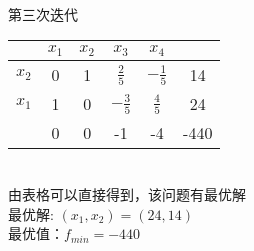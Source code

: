\documentclass{article}
\begin{document}
\\
\\
\\
第三次迭代
\begin{table}[h]
    \setlength{\abovecaptionskip}{0.cm}
    \centering
    \begin{tabular}
        {>{}rccccc}
        \toprule[1pt]
        \rowcolor[gray]{0.9}    &$x_1$ &$x_2$   &$x_3$  &$x_4$ & \\
        \midrule
        $x_2$   &0   &1  &$\frac{2}{5}$  &$-\frac{1}{5}$ & 14  \\
        $x_1$   &1 &0    &$-\frac{3}{5}$  &$\frac{4}{5}$ & 24  \\
        & 0 & 0 & -1 & -4 & -440\\
        \bottomrule[1pt]
        \end{tabular}
\end{table}
\\
由表格可以直接得到，该问题有最优解\\
最优解: $(x_1,x_2)=(24,14)$\\
最优值：$f_{min}=-440$
\end{document}
